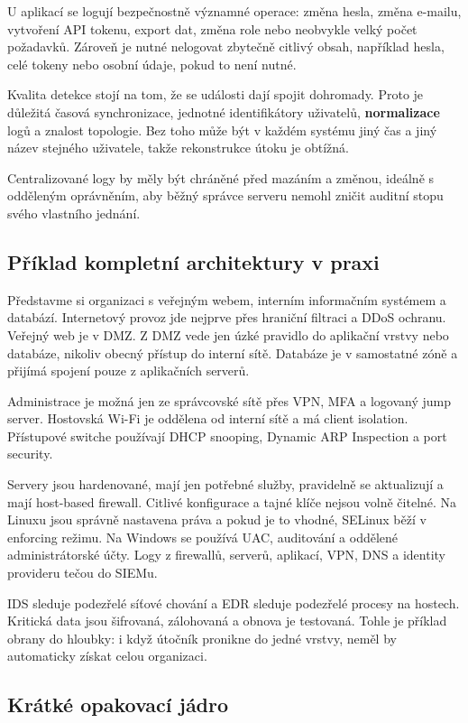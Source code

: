 \documentclass[11pt,a4paper]{article}
\begin{document}
U aplikací se logují bezpečnostně významné operace: změna hesla, změna e-mailu, vytvoření API tokenu, export dat, změna role nebo neobvykle velký počet požadavků. Zároveň je nutné nelogovat zbytečně citlivý obsah, například hesla, celé tokeny nebo osobní údaje, pokud to není nutné.

Kvalita detekce stojí na tom, že se události dají spojit dohromady. Proto je důležitá časová synchronizace, jednotné identifikátory uživatelů, \textbf{normalizace} logů a znalost topologie. Bez toho může být v každém systému jiný čas a jiný název stejného uživatele, takže rekonstrukce útoku je obtížná.

Centralizované logy by měly být chráněné před mazáním a změnou, ideálně s odděleným oprávněním, aby běžný správce serveru nemohl zničit auditní stopu svého vlastního jednání.

\subsection*{Příklad kompletní architektury v praxi}

Představme si organizaci s veřejným webem, interním informačním systémem a databází. Internetový provoz jde nejprve přes hraniční filtraci a DDoS ochranu. Veřejný web je v DMZ. Z DMZ vede jen úzké pravidlo do aplikační vrstvy nebo databáze, nikoliv obecný přístup do interní sítě. Databáze je v samostatné zóně a přijímá spojení pouze z aplikačních serverů.

Administrace je možná jen ze správcovské sítě přes VPN, MFA a logovaný jump server. Hostovská Wi-Fi je oddělena od interní sítě a má client isolation. Přístupové switche používají DHCP snooping, Dynamic ARP Inspection a port security.

Servery jsou hardenované, mají jen potřebné služby, pravidelně se aktualizují a mají host-based firewall. Citlivé konfigurace a tajné klíče nejsou volně čitelné. Na Linuxu jsou správně nastavena práva a pokud je to vhodné, SELinux běží v enforcing režimu. Na Windows se používá UAC, auditování a oddělené administrátorské účty. Logy z firewallů, serverů, aplikací, VPN, DNS a identity provideru tečou do SIEMu.

IDS sleduje podezřelé síťové chování a EDR sleduje podezřelé procesy na hostech. Kritická data jsou šifrovaná, zálohovaná a obnova je testovaná. Tohle je příklad obrany do hloubky: i když útočník pronikne do jedné vrstvy, neměl by automaticky získat celou organizaci.

\subsection*{Krátké opakovací jádro}
\end{document}

